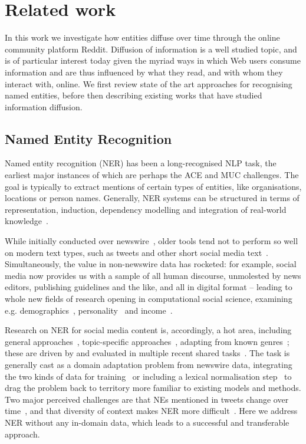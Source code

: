 \documentclass[10pt,journal,compsoc]{IEEEtran}
\begin{document}

\section{Related work}
\label{sec:rw}
In this work we investigate how entities diffuse over time through the online community platform Reddit.
Diffusion of information is a well studied topic, and is of particular interest today given the myriad ways in which Web users consume information and are thus influenced by what they read, and with whom they interact with, online.
We first review state of the art approaches for recognising named entities, before then describing existing works that have studied information diffusion.

\subsection{Named Entity Recognition}
Named entity recognition (NER) has been a long-recognised NLP task, the earliest major instances of which are perhaps the ACE and MUC challenges.
The goal is typically to extract mentions of certain types of entities, like organisations, locations or person names.
Generally, NER systems can be structured in terms of representation, induction, dependency modelling and integration of real-world knowledge~\cite{nadeau2007survey,ratinov2009design}.

While initially conducted over newswire~\cite{tjong2003introduction}, older tools tend not to perform so well on modern text types, such as tweets and other short social media text~\cite{derczynski2013microblog}.
Simultaneously, the value in non-newswire data has rocketed: for example, social media now provides us with a sample of all human discourse, unmolested by news editors, publishing guidelines and the like, and all in digital format -- leading to whole new fields of research opening in computational social science, examining e.g. demographics~\cite{hovy2015user}, personality~\cite{plank2015personality} and income~\cite{preoctiuc2015studying}.

Research on NER for social media content is, accordingly, a hot area, including general approaches~\cite{ritter2011named}, topic-specific approaches~\cite{liu2011recognizing}, adapting from known genres~\cite{plank2014adapting}; these are driven by and evaluated in multiple recent shared tasks~\cite{rowe2015microposts2015,baldwin2015shared}.
The task is generally cast as a domain adaptation problem from newswire data, integrating the two kinds of data for training~\cite{cherryunreasonable} or including a lexical normalisation step~\cite{han2011lexical} to drag the problem back to territory more familiar to existing models and methods.
Two major perceived challenges are that NEs mentioned in tweets change over time~\cite{fromreide2014crowdsourcing}, and that diversity of context makes NER more difficult~\cite{derczynski2015analysis}. 
Here we address NER without any in-domain data, which leads to a successful and transferable approach.
\end{document}
